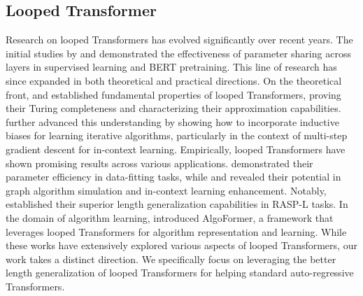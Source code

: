 \subsection{Looped Transformer}
Research on looped Transformers has evolved significantly over recent years. The initial studies by \citet{dehghani2018universal} and \citet{lan2020albert} demonstrated the effectiveness of parameter sharing across layers in supervised learning and BERT pretraining. This line of research has since expanded in both theoretical and practical directions. On the theoretical front, \citet{giannou2023looped} and \citet{xu2024expressive} established fundamental properties of looped Transformers, proving their Turing completeness and characterizing their approximation capabilities. \citet{gatmiry2024can} further advanced this understanding by showing how to incorporate inductive biases for learning iterative algorithms, particularly in the context of multi-step gradient descent for in-context learning. Empirically, looped Transformers have shown promising results across various applications. \citet{yang2024looped} demonstrated their parameter efficiency in data-fitting tasks, while \citet{luca2024simulation} and \citet{chen2024bypassing} revealed their potential in graph algorithm simulation and in-context learning enhancement. Notably, \citet{fan2024looped} established their superior length generalization capabilities in RASP-L tasks. In the domain of algorithm learning, \citet{gao2024expressive} introduced AlgoFormer, a framework that leverages looped Transformers for algorithm representation and learning. While these works have extensively explored various aspects of looped Transformers, our work takes a distinct direction. We specifically focus on leveraging the better length generalization of looped Transformers for helping standard auto-regressive Transformers.

